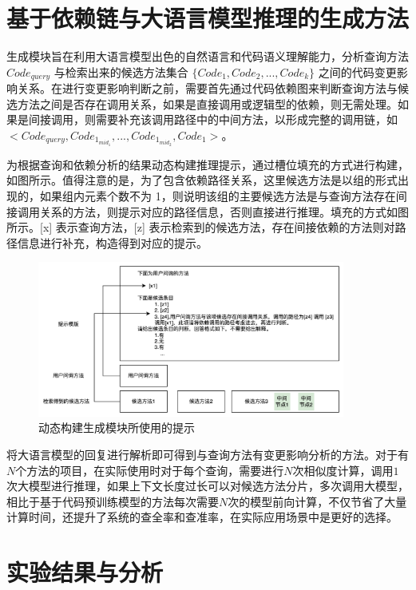 \section{基于依赖链与大语言模型推理的生成方法}

生成模块旨在利用大语言模型出色的自然语言和代码语义理解能力，分析查询方法 $Code_{query}$ 与检索出来的候选方法集合 $\{Code_1, Code_2, ..., Code_k\}$ 之间的代码变更影响关系。在进行变更影响判断之前，需要首先通过代码依赖图来判断查询方法与候选方法之间是否存在调用关系，如果是直接调用或逻辑型的依赖，则无需处理。如果是间接调用，则需要补充该调用路径中的中间方法，以形成完整的调用链，如$<Code_{query},Code_{1_{mid_1}},...,Code_{1_{mid_2}},Code_1>$。

为根据查询和依赖分析的结果动态构建推理提示，通过槽位填充的方式进行构建，如图\label{2_推理prompt}所示。值得注意的是，为了包含依赖路径关系，这里候选方法是以组的形式出现的，如果组内元素个数不为 1，则说明该组的主要候选方法是与查询方法存在间接调用关系的方法，则提示对应的路径信息，否则直接进行推理。填充的方式如图所示。[x] 表示查询方法，[z] 表示检索到的候选方法，存在间接依赖的方法则对路径信息进行补充，构造得到对应的提示。

\begin{figure}[htbp]
\centering
\includegraphics[width = 0.9\textwidth]{figures/提示词填充.jpg}
\caption{动态构建生成模块所使用的提示}
\label{2_推理prompt}
\end{figure}


将大语言模型的回复进行解析即可得到与查询方法有变更影响分析的方法。对于有$N$个方法的项目，在实际使用时对于每个查询，需要进行$N$次相似度计算，调用$1$次大模型进行推理，如果上下文长度过长可以对候选方法分片，多次调用大模型，相比于基于代码预训练模型的方法每次需要$N$次的模型前向计算，不仅节省了大量计算时间，还提升了系统的查全率和查准率，在实际应用场景中是更好的选择。


\section{实验结果与分析}

